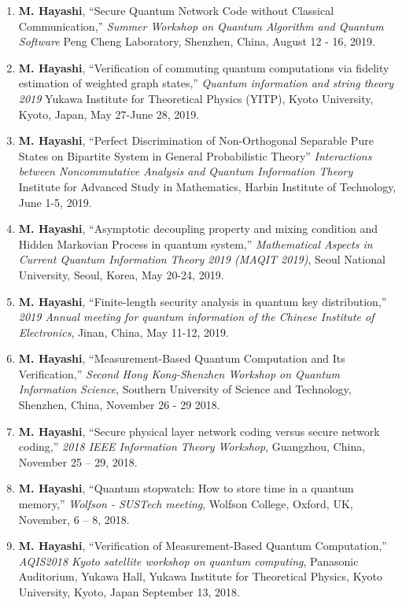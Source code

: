 \documentclass[a4paper,12pt,oneside]{article}
\begin{document}
\begin{enumerate}
\item 
\textbf{M. Hayashi}, 
``Secure Quantum Network Code without Classical Communication,''
{\em  Summer Workshop on Quantum Algorithm and Quantum Software}
Peng Cheng Laboratory, Shenzhen, China,
August 12 - 16, 2019.

\item 
\textbf{M. Hayashi}, 
``Verification of commuting quantum computations via fidelity estimation of weighted graph states,''
{\em  Quantum information and string theory 2019}
Yukawa Institute for Theoretical Physics (YITP), Kyoto University, Kyoto, Japan,
May 27-June 28, 2019.

\item 
\textbf{M. Hayashi}, 
``Perfect Discrimination of Non-Orthogonal Separable Pure States on Bipartite System in General Probabilistic Theory''
{\em  Interactions between Noncommutative Analysis and Quantum Information Theory}
Institute for Advanced Study in Mathematics, Harbin Institute of Technology,
June 1-5, 2019.

\item 
\textbf{M. Hayashi}, 
``Asymptotic decoupling property and mixing condition and Hidden Markovian Process in quantum system,''
{\em Mathematical Aspects in Current Quantum Information Theory 2019 (MAQIT 2019)}, 
Seoul National University, Seoul, Korea,
May 20-24, 2019. 

\item 
\textbf{M. Hayashi}, 
``Finite-length security analysis in quantum key distribution,''
{\em 2019 Annual meeting for quantum information of the Chinese Institute of Electronics},
Jinan, China,
May 11-12, 2019.

\item 
\textbf{M. Hayashi}, 
``Measurement-Based Quantum Computation and Its Verification,''
{\em Second Hong Kong-Shenzhen Workshop on Quantum Information Science}, 
Southern University of Science and Technology, Shenzhen, China,
November 26 - 29 2018.

\item 
\textbf{M. Hayashi}, 
``Secure physical layer network coding versus secure network coding,''
{\em 2018 IEEE Information Theory Workshop}, 
Guangzhou, China, November 25 -- 29, 2018.

\item 
\textbf{M. Hayashi}, 
``Quantum stopwatch: How to store time in a quantum memory,''
{\em Wolfson - SUSTech meeting}, 
Wolfson College, Oxford, UK, November, 6 -- 8,  2018.

\item 
\textbf{M. Hayashi}, 
``Verification of Measurement-Based Quantum Computation,''
{\em AQIS2018 Kyoto satellite workshop on quantum computing}, 
Panasonic Auditorium, Yukawa Hall, Yukawa Institute for Theoretical Physics, Kyoto University, Kyoto, Japan
September 13, 2018.


\end{enumerate}
\end{document}
